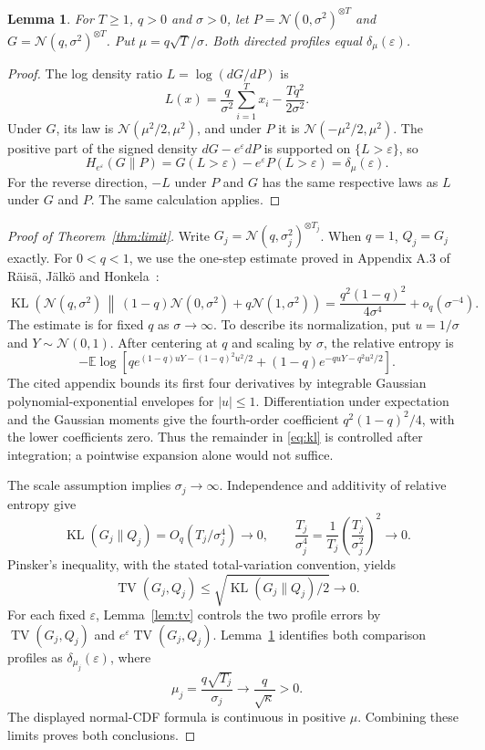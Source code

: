\documentclass[a4paper,11pt]{article}
\newtheorem{lemma}{Lemma}
\newcommand{\TV}{\operatorname{TV}}
\newcommand{\KL}{\operatorname{KL}}
\newcommand{\Normal}{\mathcal N}
\newcommand{\E}{\mathbb E}
\begin{document}
\begin{lemma}\label{lem:gaussian}
For $T\geq1$, $q>0$ and $\sigma>0$, let $P=\Normal(0,\sigma^2)^{\otimes T}$ and $G=\Normal(q,\sigma^2)^{\otimes T}$. Put $\mu=q\sqrt T/\sigma$. Both directed profiles equal $\delta_\mu(\varepsilon)$.
\end{lemma}
\begin{proof}
The log density ratio $L=\log(dG/dP)$ is
\[
 L(x)=\frac q{\sigma^2}\sum_{i=1}^T x_i-\frac{Tq^2}{2\sigma^2}.
\]
Under $G$, its law is $\Normal(\mu^2/2,\mu^2)$, and under $P$ it is $\Normal(-\mu^2/2,\mu^2)$. The positive part of the signed density $dG-e^\varepsilon dP$ is supported on $\{L>\varepsilon\}$, so
\[
 H_{e^\varepsilon}(G\|P)=G(L>\varepsilon)-e^\varepsilon P(L>\varepsilon)=\delta_\mu(\varepsilon).
\]
For the reverse direction, $-L$ under $P$ and $G$ has the same respective laws as $L$ under $G$ and $P$. The same calculation applies.
\end{proof}

\begin{proof}[Proof of Theorem~\ref{thm:limit}]
Write $G_j=\Normal(q,\sigma_j^2)^{\otimes T_j}$. When $q=1$, $Q_j=G_j$ exactly. For $0<q<1$, we use the one-step estimate proved in Appendix A.3 of R\"ais\"a, J\"alk\"o and Honkela~\cite{snm}:
\begin{equation}\label{eq:kl}
 \KL\left(\Normal(q,\sigma^2)\,\middle\|\,
 (1-q)\Normal(0,\sigma^2)+q\Normal(1,\sigma^2)\right)
 =\frac{q^2(1-q)^2}{4\sigma^4}+o_q(\sigma^{-4}).
\end{equation}
The estimate is for fixed $q$ as $\sigma\to\infty$. To describe its normalization, put $u=1/\sigma$ and $Y\sim\Normal(0,1)$. After centering at $q$ and scaling by $\sigma$, the relative entropy is
\[
 -\E\log\left[q e^{(1-q)uY-(1-q)^2u^2/2}
 +(1-q)e^{-quY-q^2u^2/2}\right].
\]
The cited appendix bounds its first four derivatives by integrable Gaussian polynomial-exponential envelopes for $|u|\leq1$. Differentiation under expectation and the Gaussian moments give the fourth-order coefficient $q^2(1-q)^2/4$, with the lower coefficients zero. Thus the remainder in \eqref{eq:kl} is controlled after integration; a pointwise expansion alone would not suffice.

The scale assumption implies $\sigma_j\to\infty$. Independence and additivity of relative entropy give
\[
 \KL(G_j\|Q_j)=O_q(T_j/\sigma_j^4)\longrightarrow0,
 \qquad
 \frac{T_j}{\sigma_j^4}
 =\frac1{T_j}\left(\frac{T_j}{\sigma_j^2}\right)^2\longrightarrow0.
\]
Pinsker's inequality, with the stated total-variation convention, yields
\[
 \TV(G_j,Q_j)\leq\sqrt{\KL(G_j\|Q_j)/2}\longrightarrow0.
\]
For each fixed $\varepsilon$, Lemma~\ref{lem:tv} controls the two profile errors by $\TV(G_j,Q_j)$ and $e^\varepsilon\TV(G_j,Q_j)$. Lemma~\ref{lem:gaussian} identifies both comparison profiles as $\delta_{\mu_j}(\varepsilon)$, where
\[
 \mu_j=\frac{q\sqrt{T_j}}{\sigma_j}\longrightarrow\frac q{\sqrt\kappa}>0.
\]
The displayed normal-CDF formula is continuous in positive $\mu$. Combining these limits proves both conclusions.
\end{proof}
\end{document}
